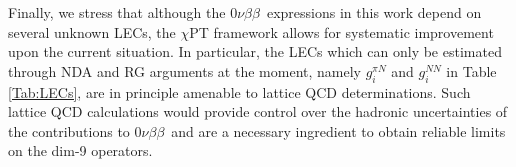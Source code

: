 \documentclass[letterpaper,11pt]{article}
\newcommand{\NLDBD}{$0 \nu \beta \beta$}
\begin{document}
Finally, we stress that although the \NLDBD\ expressions in this work depend on several unknown LECs, the $\chi$PT framework allows for systematic improvement upon the current situation. In particular, the LECs which can  only be estimated through NDA and RG arguments at the moment, namely $g^{\pi N}_i$ and $g_{i}^{NN}$ in Table \ref{Tab:LECs}, are in principle amenable to lattice QCD determinations. Such lattice QCD calculations would provide control over the hadronic uncertainties of the contributions to \NLDBD\, and are a necessary ingredient to obtain reliable limits on the dim-9 operators.


 

\end{document}
